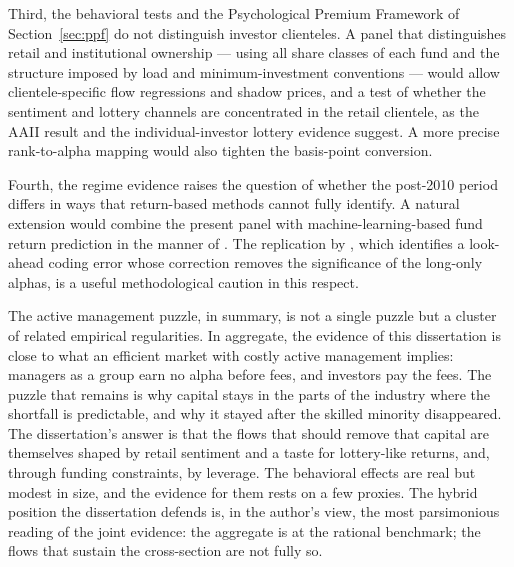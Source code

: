\documentclass[12pt, oneside]{report}
\begin{document}
Third, the behavioral tests and the Psychological Premium Framework of
Section~\ref{sec:ppf} do not distinguish investor clienteles. A panel
that distinguishes retail and institutional ownership --- using all
share classes of each fund and the structure imposed by load and
minimum-investment conventions --- would allow clientele-specific flow
regressions and shadow prices, and a test of whether the sentiment and
lottery channels are concentrated in the retail clientele, as the
AAII result and the \textcite{Kumar2009} individual-investor lottery
evidence suggest. A more precise rank-to-alpha mapping would also tighten
the basis-point conversion.

Fourth, the regime evidence raises the question of whether the post-2010
period differs in ways that return-based methods cannot fully identify.
A natural extension would combine the present panel with
machine-learning-based fund return prediction in the manner of
\textcite{DeMiguelEtal2023}. The replication by \textcite{FauschEtal2025},
which identifies a look-ahead coding error whose correction removes the
significance of the long-only alphas, is a useful methodological caution
in this respect.

The active management puzzle, in summary, is not a single puzzle but a
cluster of related empirical regularities. In aggregate, the evidence of
this dissertation is close to what an efficient market with costly
active management implies: managers as a group earn no alpha before fees,
and investors pay the fees. The puzzle that remains is why capital stays
in the parts of the industry where the shortfall is predictable, and why
it stayed after the skilled minority disappeared. The dissertation's
answer is that the flows that should remove that capital are themselves
shaped by retail sentiment and a taste for lottery-like returns, and,
through funding constraints, by leverage. The behavioral effects are
real but modest in size, and the evidence for them rests on a few
proxies. The hybrid position the dissertation defends is, in the
author's view, the most parsimonious reading of the joint evidence: the
aggregate is at the rational benchmark; the flows that sustain the
cross-section are not fully so.

\appendix

\renewcommand{\thetable}{\thechapter\arabic{table}}
\renewcommand{\thefigure}{\thechapter\arabic{figure}}
\makeatletter
\renewcommand{\ext@table}{lat}
\makeatother
\renewcommand{\theequation}{\thechapter.\arabic{equation}}
\end{document}
